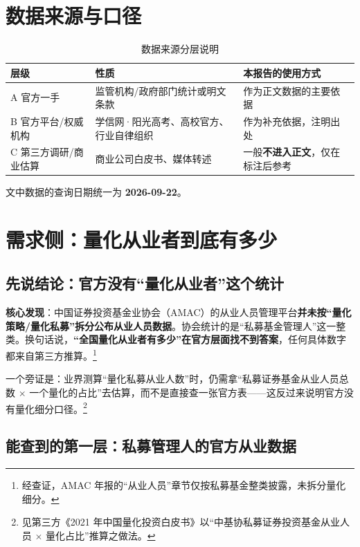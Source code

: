 \documentclass[UTF8,11pt]{ctexart}
\begin{document}
\section{数据来源与口径}

\begin{table}[ht]
\centering
\small
\begin{tabular}{@{}p{3.0cm}p{4.4cm}p{4.3cm}@{}}
\toprule
\textbf{层级} & \textbf{性质} & \textbf{本报告的使用方式} \\
\midrule
A 官方一手 & 监管机构/政府部门统计或明文条款 & 作为正文数据的主要依据 \\
B 官方平台/权威机构 & 学信网·阳光高考、高校官方、行业自律组织 & 作为补充依据，注明出处 \\
C 第三方调研/商业估算 & 商业公司白皮书、媒体转述 & 一般\textbf{不进入正文}，仅在标注后参考 \\
\bottomrule
\end{tabular}
\caption{数据来源分层说明}
\end{table}

\noindent 文中数据的查询日期统一为 \textbf{2026-09-22}。

\section{需求侧：量化从业者到底有多少}

\subsection{先说结论：官方没有“量化从业者”这个统计}

\textbf{核心发现}：中国证券投资基金业协会（AMAC）的从业人员管理平台\textbf{并未按“量化策略/量化私募”拆分公布从业人员数据}。协会统计的是“私募基金管理人”这一整类。换句话说，\textbf{“全国量化从业者有多少”在官方层面找不到答案}，任何具体数字都来自第三方推算。\footnote{经查证，AMAC 年报的“从业人员”章节仅按私募基金整类披露，未拆分量化细分。}

一个旁证是：业界测算“量化私募从业人数”时，仍需拿“私募证券基金从业人员总数 $\times$ 一个量化的占比”去估算，而不是直接查一张官方表——这反过来说明官方没有量化细分口径。\footnote{见第三方《2021 年中国量化投资白皮书》以“中基协私募证券投资基金从业人员 $\times$ 量化占比”推算之做法。}

\subsection{能查到的第一层：私募管理人的官方从业数据}
\end{document}
